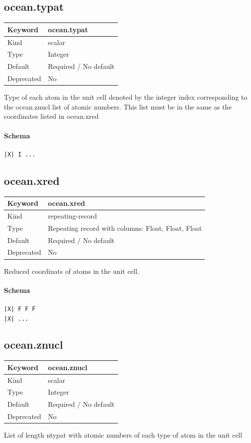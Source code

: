 \documentclass[11pt]{article}
\begin{document}
{{{{{\subsection{ocean.typat}
\label{kw:ocean-typat}
\begin{longtable}{|p{1.5in}|p{4.5in}|}
\hline
Keyword & ocean.typat \\
\hline
Kind & scalar \\
\hline
Type & Integer \\
\hline
Default & Required / No default \\
\hline
Deprecated & No \\
\hline
\end{longtable}
 Type of each atom in the unit cell denoted by the integer index corresponding
 to the ocean.znucl list of atomic numbers. This list must be in the same
 as the coordinates listed in ocean.xred

\paragraph{Schema}
\begin{Verbatim}
|X| I ...
\end{Verbatim}

\subsection{ocean.xred}
\label{kw:ocean-xred}
\begin{longtable}{|p{1.5in}|p{4.5in}|}
\hline
Keyword & ocean.xred \\
\hline
Kind & repeating-record \\
\hline
Type & Repeating record with columns: Float, Float, Float \\
\hline
Default & Required / No default \\
\hline
Deprecated & No \\
\hline
\end{longtable}
 Reduced coordinats of atoms in the unit cell.

\paragraph{Schema}
\begin{Verbatim}
|X| F F F
|X| ...
\end{Verbatim}

\subsection{ocean.znucl}
\label{kw:ocean-znucl}
\begin{longtable}{|p{1.5in}|p{4.5in}|}
\hline
Keyword & ocean.znucl \\
\hline
Kind & scalar \\
\hline
Type & Integer \\
\hline
Default & Required / No default \\
\hline
Deprecated & No \\
\hline
\end{longtable}
 List of length ntypat with atomic numbers of each type of atom in the unit cell

}}}}}
\end{document}
